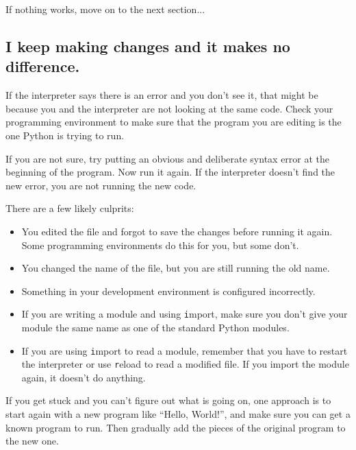 \documentclass[
DIV=11,
fontsize=13,
twoside,
headinclude=false,
titlepage=firstiscover,
abstract=true,
headsepline=true,
footsepline=true,
chapterprefix=true, %
headings=big,
bibliography=totoc,%
captions=tableheading
]{scrbook}
\theoremstyle{definition}
\begin{document}
If nothing works, move on to the next section...


\subsection{I keep making changes and it makes no difference.}

If the interpreter says there is an error and you don't see it, that
might be because you and the interpreter are not looking at the same
code.  Check your programming environment to make sure that the
program you are editing is the one Python is trying to run.

If you are not sure, try putting an obvious and deliberate syntax
error at the beginning of the program.  Now run it again.  If the
interpreter doesn't find the new error, you are not running the
new code.

There are a few likely culprits:

\begin{itemize}

\item You edited the file and forgot to save the changes before
running it again.  Some programming environments do this
for you, but some don't.

\item You changed the name of the file, but you are still running
the old name.

\item Something in your development environment is configured
incorrectly.

\item If you are writing a module and using {\texttt import},
make sure you don't give your module the same name as one
of the standard Python modules.

\item If you are using {\texttt import} to read a module, remember
that you have to restart the interpreter or use {\texttt reload}
to read a modified file.  If you import the module again, it
doesn't do anything.

\end{itemize}

If you get stuck and you can't figure out what is going on, one
approach is to start again with a new program like ``Hello, World!'',
and make sure you can get a known program to run.  Then gradually add
the pieces of the original program to the new one.
\end{document}
